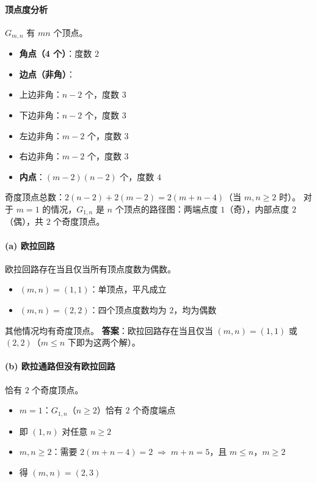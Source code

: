 \documentclass[10pt,a4paper,openany]{ctexbook}
\theoremstyle{definition}
\theoremstyle{remark}
\begin{document}
\paragraph{顶点度分析}

$G_{m,n}$ 有 $mn$ 个顶点。
\begin{itemize}
\item \textbf{角点（4 个）}：度数 $2$
\item \textbf{边点（非角）}：
\item 上边非角：$n-2$ 个，度数 $3$
\item 下边非角：$n-2$ 个，度数 $3$
\item 左边非角：$m-2$ 个，度数 $3$
\item 右边非角：$m-2$ 个，度数 $3$
\item \textbf{内点}：$(m-2)(n-2)$ 个，度数 $4$

\end{itemize}

奇度顶点总数：$2(n-2) + 2(m-2) = 2(m+n-4)$（当 $m,n \ge 2$ 时）。
对于 $m=1$ 的情况，$G_{1,n}$ 是 $n$ 个顶点的路径图：两端点度 $1$（奇），内部点度 $2$（偶），共 $2$ 个奇度顶点。
\vspace{-2pt}

\paragraph{(a) 欧拉回路}

欧拉回路存在当且仅当所有顶点度数为偶数。
\begin{itemize}
\item $(m,n) = (1,1)$：单顶点，平凡成立
\item $(m,n) = (2,2)$：四个顶点度数均为 $2$，均为偶数

\end{itemize}

其他情况均有奇度顶点。
\textbf{答案}：欧拉回路存在当且仅当 $(m,n) = (1,1)$ 或 $(2,2)$（$m \leq n$ 下即为这两个解）。
\vspace{-2pt}

\paragraph{(b) 欧拉通路但没有欧拉回路}

恰有 $2$ 个奇度顶点。
\begin{itemize}
\item $m = 1$：$G_{1,n}$（$n \ge 2$）恰有 $2$ 个奇度端点
\item 即 $(1, n)$ 对任意 $n \ge 2$
\item $m, n \ge 2$：需要 $2(m+n-4) = 2 \;\Rightarrow\; m+n = 5$，且 $m \le n$，$m \ge 2$
\item 得 $(m,n) = (2,3)$

\end{itemize}
\end{document}

